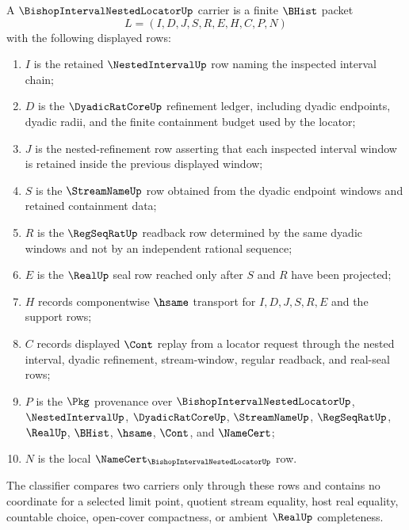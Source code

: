 \begin{definition}
\label{def:bishop-interval-nested-locator-carrier}
A $\BishopIntervalNestedLocatorUp$ carrier is a finite $\BHist$ packet
$$
L=(I,D,J,S,R,E,H,C,P,N)
$$
with the following displayed rows:
\begin{enumerate}
\item $I$ is the retained $\NestedIntervalUp$ row naming the inspected interval chain;
\item $D$ is the $\DyadicRatCoreUp$ refinement ledger, including dyadic endpoints, dyadic radii, and the finite containment budget used by the locator;
\item $J$ is the nested-refinement row asserting that each inspected interval window is retained inside the previous displayed window;
\item $S$ is the $\StreamNameUp$ row obtained from the dyadic endpoint windows and retained containment data;
\item $R$ is the $\RegSeqRatUp$ readback row determined by the same dyadic windows and not by an independent rational sequence;
\item $E$ is the $\RealUp$ seal row reached only after $S$ and $R$ have been projected;
\item $H$ records componentwise $\hsame$ transport for $I,D,J,S,R,E$ and the support rows;
\item $C$ records displayed $\Cont$ replay from a locator request through the nested interval, dyadic refinement, stream-window, regular readback, and real-seal rows;
\item $P$ is the $\Pkg$ provenance over $\BishopIntervalNestedLocatorUp$, $\NestedIntervalUp$, $\DyadicRatCoreUp$, $\StreamNameUp$, $\RegSeqRatUp$, $\RealUp$, $\BHist$, $\hsame$, $\Cont$, and $\NameCert$;
\item $N$ is the local $\NameCert_{\BishopIntervalNestedLocatorUp}$ row.
\end{enumerate}
The classifier compares two carriers only through these rows and contains no coordinate for a selected limit point, quotient stream equality, host real equality, countable choice, open-cover compactness, or ambient $\RealUp$ completeness.
\end{definition}

